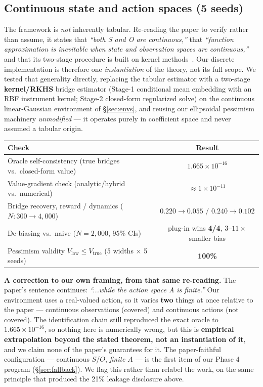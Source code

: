 \documentclass[11pt]{article}
\begin{document}
\subsection{Continuous state and action spaces (5 seeds)}
\label{sec:continuous}

The framework is \emph{not} inherently tabular. Re-reading the paper to verify rather than
assume, it states that \emph{``both S and O are continuous,''} that \emph{``function
approximation is inevitable when state and observation spaces are continuous,''} and that
its two-stage procedure is built on kernel methods~\cite{mastouri2021}. Our discrete
implementation is therefore one \emph{instantiation} of the theory, not its full scope. We
tested that generality directly, replacing the tabular estimator with a two-stage
\textbf{kernel/RKHS} bridge estimator (Stage-1 conditional mean embedding with an RBF
instrument kernel; Stage-2 closed-form regularized solve) on the continuous linear-Gaussian
environment of \S\ref{sec:envs}, and reusing our ellipsoidal pessimism machinery
\emph{unmodified} --- it operates purely in coefficient space and never assumed a tabular
origin.

\begin{center}
\begin{tabular}{@{}lc@{}}
\toprule
Check & Result \\
\midrule
Oracle self-consistency (true bridges vs.\ closed-form value) & $1.665\times10^{-16}$ \\
Value-gradient check (analytic/hybrid vs.\ numerical) & $\approx 1\times10^{-11}$ \\
Bridge recovery, reward / dynamics ($N: 300 \to 4{,}000$) & $0.220 \to 0.055$ / $0.240 \to 0.102$ \\
De-biasing vs.\ naive ($N{=}2{,}000$, 95\% CIs) & plug-in wins \textbf{4/4}, $3$--$11\times$ smaller bias \\
Pessimism validity $V_{\mathrm{low}} \le V_{\mathrm{true}}$ (5 widths $\times$ 5 seeds) & \textbf{100\%} \\
\bottomrule
\end{tabular}
\end{center}

\noindent\textbf{A correction to our own framing, from that same re-reading.} The paper's
sentence continues: \emph{``...while the action space A is finite.''} Our environment uses
a real-valued action, so it varies \textbf{two} things at once relative to the paper ---
continuous observations (covered) and continuous actions (not covered). The identification
chain still reproduced the exact oracle to $1.665\times10^{-16}$, so nothing here is
numerically wrong, but this is \textbf{empirical extrapolation beyond the stated theorem,
not an instantiation of it}, and we claim none of the paper's guarantees for it. The
paper-faithful configuration --- continuous $S$/$O$, \emph{finite} $A$ --- is the first
item of our Phase 4 program (\S\ref{sec:fallback}). We flag this rather than relabel the
work, on the same principle that produced the 21\% leakage disclosure above.
\end{document}
